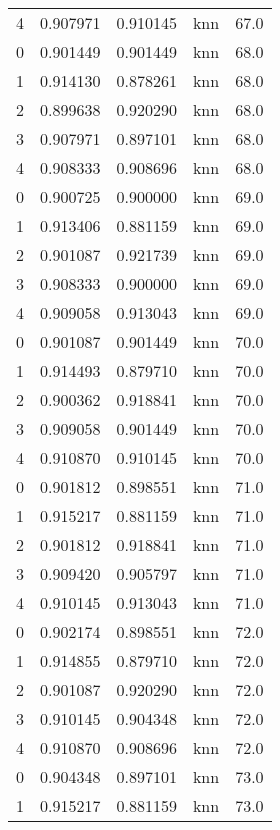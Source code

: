 \begin{tabular}{rrrlr}
     4 & 0.907971 & 0.910145 &      knn &       67.0 \\
     0 & 0.901449 & 0.901449 &      knn &       68.0 \\
     1 & 0.914130 & 0.878261 &      knn &       68.0 \\
     2 & 0.899638 & 0.920290 &      knn &       68.0 \\
     3 & 0.907971 & 0.897101 &      knn &       68.0 \\
     4 & 0.908333 & 0.908696 &      knn &       68.0 \\
     0 & 0.900725 & 0.900000 &      knn &       69.0 \\
     1 & 0.913406 & 0.881159 &      knn &       69.0 \\
     2 & 0.901087 & 0.921739 &      knn &       69.0 \\
     3 & 0.908333 & 0.900000 &      knn &       69.0 \\
     4 & 0.909058 & 0.913043 &      knn &       69.0 \\
     0 & 0.901087 & 0.901449 &      knn &       70.0 \\
     1 & 0.914493 & 0.879710 &      knn &       70.0 \\
     2 & 0.900362 & 0.918841 &      knn &       70.0 \\
     3 & 0.909058 & 0.901449 &      knn &       70.0 \\
     4 & 0.910870 & 0.910145 &      knn &       70.0 \\
     0 & 0.901812 & 0.898551 &      knn &       71.0 \\
     1 & 0.915217 & 0.881159 &      knn &       71.0 \\
     2 & 0.901812 & 0.918841 &      knn &       71.0 \\
     3 & 0.909420 & 0.905797 &      knn &       71.0 \\
     4 & 0.910145 & 0.913043 &      knn &       71.0 \\
     0 & 0.902174 & 0.898551 &      knn &       72.0 \\
     1 & 0.914855 & 0.879710 &      knn &       72.0 \\
     2 & 0.901087 & 0.920290 &      knn &       72.0 \\
     3 & 0.910145 & 0.904348 &      knn &       72.0 \\
     4 & 0.910870 & 0.908696 &      knn &       72.0 \\
     0 & 0.904348 & 0.897101 &      knn &       73.0 \\
     1 & 0.915217 & 0.881159 &      knn &       73.0 \\

\end{tabular}
